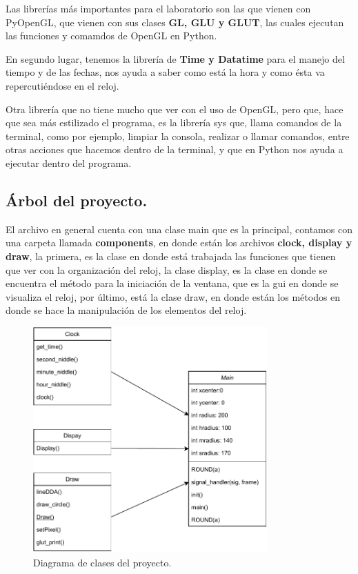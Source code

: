 Las librerías más importantes para el laboratorio son las que vienen con PyOpenGL, que vienen con sus clases \textbf{GL, GLU y GLUT}, las cuales ejecutan las funciones y comamdos de OpenGL en Python.

En segundo lugar, tenemos la librería de \textbf{Time y Datatime} para el manejo del tiempo y de las fechas, nos ayuda a saber como está la hora y como ésta va repercutiéndose en el reloj.

Otra librería que no tiene mucho que ver con el uso de OpenGL, pero que, hace que sea más estilizado el programa, es la librería sys que, llama comandos de la terminal, como por ejemplo, limpiar la consola, realizar o llamar comandos, entre otras acciones que hacemos dentro de la terminal, y que en Python nos ayuda a ejecutar dentro del programa.

\subsection{Árbol del proyecto.} \label{subsec:arbol}
El archivo en general cuenta con una clase main que es la principal, contamos con una carpeta llamada \textbf{components}, en donde están los archivos \textbf{clock, display y draw}, la primera, es la clase en donde está trabajada las funciones que tienen que ver con la organización del reloj, la clase display, es la clase en donde se encuentra el método para la iniciación de la ventana, que es la gui en donde se visualiza el reloj, por último, está la clase draw, en donde están los métodos en donde se hace la manipulación de los elementos del reloj.

\begin{figure}[H]
	\centering
	\includegraphics[width=0.8\textwidth]{../img/chapter02/3.pdf}
	\caption{Diagrama de clases del proyecto.}
	\label{fig:diagrama_clases}
\end{figure}







